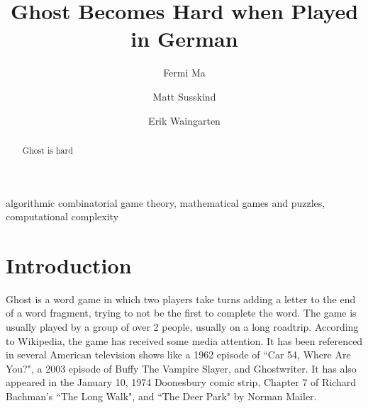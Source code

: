\documentclass[runningheads,a4paper]{llncs}
\newcommand{\keywords}[1]{\par\addvspace\baselineskip
\noindent\keywordname\enspace\ignorespaces#1}
\begin{document}
\mainmatter  

\title{Ghost Becomes Hard when Played in German}


\author{Fermi Ma
\and Matt Susskind \and Erik Waingarten}
%


%
%

\maketitle


\begin{abstract}
Ghost is hard
\end{abstract}

\keywords{algorithmic combinatorial game theory, mathematical games and puzzles, computational complexity}

\section{Introduction}

	Ghost is a word game in which two players take turns adding a letter to the end of a word fragment, trying to not be the first to complete the word. The game is usually played by a group of over 2 people, usually on a long roadtrip. According to Wikipedia, the game has received some media attention. It has been referenced in several American television shows like a 1962 episode of ``Car 54, Where Are You?", a 2003 episode of Buffy The Vampire Slayer, and Ghostwriter. It has also appeared in the January 10, 1974 Doonesbury comic strip, Chapter 7 of Richard Bachman's ``The Long Walk", and ``The Deer Park" by Norman Mailer.
\end{document}
